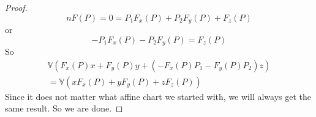 \documentclass{article}
\begin{document}
\begin{itemize}
\begin{proof}
                        \begin{equation*}
                            nF(P) = 0 = P_{1}F_{x}(P) + P_{2}F_{y}(P) + F_{z}(P)
                        \end{equation*}
                    or
                        \begin{equation*}
                            -P_{1}F_{x}(P) - P_{2}F_{y}(P) = F_{z}(P)
                        \end{equation*}
                    So 
                        \begin{gather*}
                            \mathbb{V}(F_{x}(P)x + F_{y}(P)y + (- F_{x}(P)P_{1} - F_{y}(P)P_{2})z) \\ = \mathbb{V}(xF_{x}(P) + yF_{y}(P) + zF_{z}(P))
                        \end{gather*}
                    Since it does not matter what affine chart we started with, we will always get the same result. So we are done.
                \end{proof}
    \end{itemize}

\newpage
\end{document}

